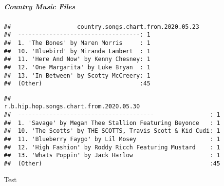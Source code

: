 \documentclass[]{article}
\let\oldsubparagraph\subparagraph
\renewcommand{\subparagraph}[1]{\oldsubparagraph{#1}\mbox{}}
\begin{document}
\hypertarget{country-music-files}{%
\subparagraph{Country Music Files}\label{country-music-files}}

\begin{verbatim}
##                   country.songs.chart.from.2020.05.23
##  -----------------------------------: 1              
##  1. 'The Bones' by Maren Morris     : 1              
##  10. 'Bluebird' by Miranda Lambert  : 1              
##  11. 'Here And Now' by Kenny Chesney: 1              
##  12. 'One Margarita' by Luke Bryan  : 1              
##  13. 'In Between' by Scotty McCreery: 1              
##  (Other)                            :45
\end{verbatim}

\begin{verbatim}
##                                     r.b.hip.hop.songs.chart.from.2020.05.30
##  ---------------------------------------                : 1                
##  1. 'Savage' by Megan Thee Stallion Featuring Beyonce   : 1                
##  10. 'The Scotts' by THE SCOTTS, Travis Scott & Kid Cudi: 1                
##  11. 'Blueberry Faygo' by Lil Mosey                     : 1                
##  12. 'High Fashion' by Roddy Ricch Featuring Mustard    : 1                
##  13. 'Whats Poppin' by Jack Harlow                      : 1                
##  (Other)                                                :45
\end{verbatim}

Test
\end{document}
